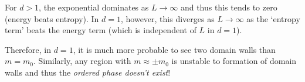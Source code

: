 For $d > 1$, the exponential dominates as $L \to \infty$ and thus this tends to zero (energy beats entropy). In $d=1$, however, this diverges as $L \to \infty$ as the `entropy term' beats the energy term (which is independent of $L$ in $d=1$).

Therefore, in $d = 1$, it is much more probable to see two domain walls than $m = m_0$. Similarly, any region with $m \approx \pm m_0$ is unstable to formation of domain walls and thus the \textit{ordered phase doesn't exist}!

